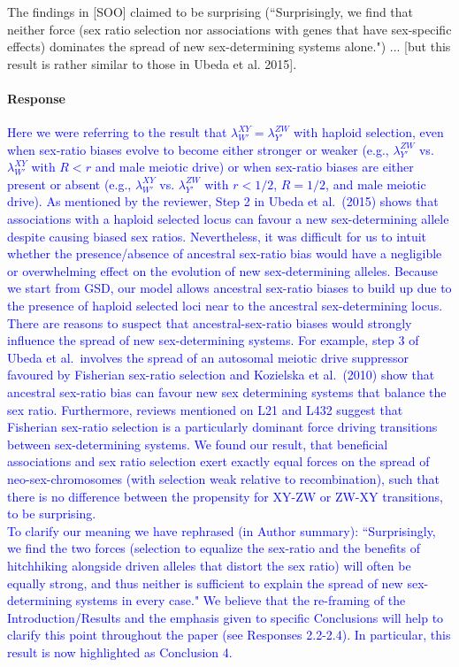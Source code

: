 \documentclass[10pt,letterpaper]{article}
\begin{document}
\noindent\subsubsection{}
The findings in [SOO] claimed to be surprising (``Surprisingly, we find that neither force (sex ratio selection nor associations with genes that have sex-specific effects) dominates the spread of new sex-determining systems alone.") ... [but this result is rather similar to those in Ubeda et al. 2015]. 

\noindent\paragraph{Response}
\textcolor{blue}{
Here we were referring to the result that $\lambda_{W'}^{XY} = \lambda_{Y'}^{ZW}$ with haploid selection, even when sex-ratio biases evolve to become either stronger or weaker (e.g., $\lambda_{Y'}^{ZW}$ vs. $\lambda_{W'}^{XY}$ with $R<r$ and male meiotic drive) or when sex-ratio biases are either present or absent (e.g., $\lambda_{W'}^{XY}$ vs. $\lambda_{Y'}^{ZW}$ with $r<1/2$, $R=1/2$, and male meiotic drive).  
As mentioned by the reviewer, Step 2 in Ubeda et al.\ (2015) shows that associations with a haploid selected locus can favour a new sex-determining allele despite causing biased sex ratios. 
Nevertheless, it was difficult for us to intuit whether the presence/absence of ancestral sex-ratio bias would have a negligible or overwhelming effect on the evolution of new sex-determining alleles. 
Because we start from GSD, our model allows ancestral sex-ratio biases to build up due to the presence of haploid selected loci near to the ancestral sex-determining locus. 
There are reasons to suspect that ancestral-sex-ratio biases would strongly influence the spread of new sex-determining systems.
For example, step 3 of Ubeda et al.\ involves the spread of an autosomal meiotic drive suppressor favoured by Fisherian sex-ratio selection and Kozielska et al.\ (2010) show that ancestral sex-ratio bias can favour new sex determining systems that balance the sex ratio.
Furthermore, reviews mentioned on L21 and L432 suggest that Fisherian sex-ratio selection is a particularly dominant force driving transitions between sex-determining systems.
We found our result, that beneficial associations and sex ratio selection exert exactly equal forces on the spread of neo-sex-chromosomes (with selection weak relative to recombination), such that there is no difference between the propensity for XY-ZW or ZW-XY transitions, to be surprising.
\\
\indent
To clarify our meaning we have rephrased (in Author summary): ``Surprisingly, we find the two forces (selection to equalize the sex-ratio and the benefits of hitchhiking alongside driven alleles that distort the sex ratio) will often be equally strong, and thus neither is sufficient to explain the spread of new sex-determining systems in every case." 
We believe that the re-framing of the Introduction/Results and the emphasis given to specific Conclusions will help to clarify this point throughout the paper (see Responses 2.2-2.4). 
In particular, this result is now highlighted as Conclusion 4.
}
\end{document}
